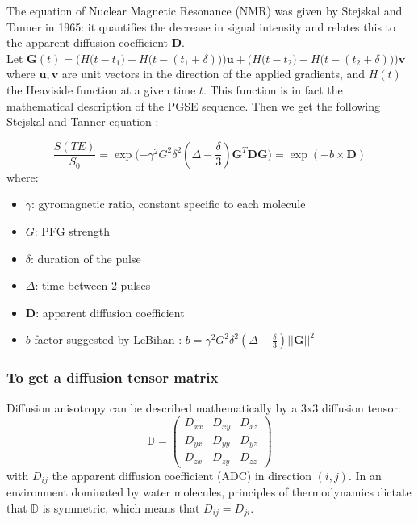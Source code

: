 The equation of Nuclear Magnetic Resonance (NMR) was given by Stejskal and Tanner in 1965: it quantifies the decrease in signal intensity and relates this to the apparent diffusion coefficient $\mathbf{D}$.\\
Let $\mathbf{G}(t) = \Big(H\big(t - t_1\big) - H\big(t - (t_1 + \delta)\big)\Big)\mathbf{u} + \Big(H\big(t - t_2\big) - H\big(t - (t_2 + \delta)\big)\Big) \mathbf{v}$\\
where $\mathbf{u}, \mathbf{v}$ are unit vectors in the direction of the applied gradients, and $H(t)$ the Heaviside function at a given time $t$. This function is in fact the mathematical description of the PGSE sequence. Then we get the following Stejskal and Tanner equation \cite{Stejskaltanner}:

\begin{equation} \label{eq:tanner}
\frac{S(TE)}{S_0} = \exp\Big({-\gamma^2G^2\delta^2(\Delta - \frac{\delta}{3})\mathbf{G}^T\mathbf{D}\mathbf{G}\Big)} = \exp (-b \times \mathbf{D})
\end{equation}
where:

\begin{itemize}
    \item $\gamma$: gyromagnetic ratio, constant specific to each molecule
    \item $G$: PFG strength
    \item $\delta$: duration of the pulse
    \item $\Delta$: time between 2 pulses
    \item $\mathbf{D}$: apparent diffusion coefficient
    \item $b$ factor suggested by LeBihan \cite{lebihan1985imagerie}: $b = \gamma^2G^2\delta^2(\Delta - \frac{\delta}{3})||\mathbf{G}||^2$
\end{itemize}

\subsubsection{To get a diffusion tensor matrix} \label{diffusion_tensor_matrix}

Diffusion anisotropy can be described mathematically by a 3x3 diffusion tensor:
\begin{equation}
    \mathbb{D} = \begin{pmatrix}
    D_{xx} & D_{xy} & D_{xz} \\
    D_{yx} & D_{yy} & D_{yz} \\
    D_{zx} & D_{zy} & D_{zz}
    \end{pmatrix}
\end{equation}
with $D_{ij}$ the apparent diffusion coefficient (ADC) in direction $(i, j)$. In an environment dominated by water molecules, principles of thermodynamics dictate that $\mathbb{D}$ is symmetric, which means that $D_{ij} = D_{ji}$.

